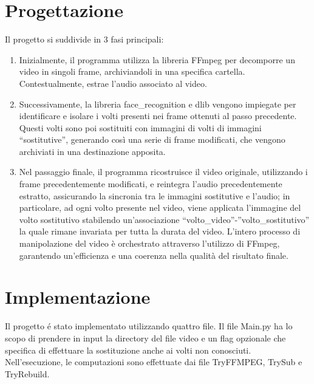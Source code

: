 \documentclass{report}
\begin{document}
\section{Progettazione}
Il progetto si suddivide in 3 fasi principali:
\begin{enumerate}
  \item
    Inizialmente, il programma utilizza la libreria FFmpeg per decomporre un video in singoli frame, archiviandoli in una specifica cartella. Contestualmente, estrae l'audio associato al video.
  \item
    Successivamente, la libreria face\_recognition e dlib vengono impiegate per identificare e isolare i volti presenti nei frame ottenuti al passo precedente. Questi volti sono poi sostituiti con immagini di volti di immagini “sostitutive”, generando così una serie di frame modificati, che vengono archiviati in una destinazione apposita.
  \item
    Nel passaggio finale, il programma ricostruisce il video originale, utilizzando i frame precedentemente modificati, e reintegra l'audio precedentemente estratto, assicurando la sincronia tra le immagini sostitutive e l'audio; in particolare, ad ogni volto presente nel video, viene applicata l’immagine del volto sostitutivo stabilendo un’associazione “volto\_video”-”volto\_sostitutivo” la quale rimane invariata per tutta la durata del video. L'intero processo di manipolazione del video è orchestrato attraverso l'utilizzo di FFmpeg, garantendo un'efficienza e una coerenza nella qualità del risultato finale.
\end{enumerate}
\section{Implementazione}
Il progetto é stato implementato utilizzando quattro file. Il file Main.py ha lo scopo di prendere in input la directory del file video e un flag opzionale che specifica di effettuare la sostituzione anche ai volti non conosciuti. \\
Nell'esecuzione, le computazioni sono effettuate dai file TryFFMPEG, TrySub e TryRebuild.
\end{document}
